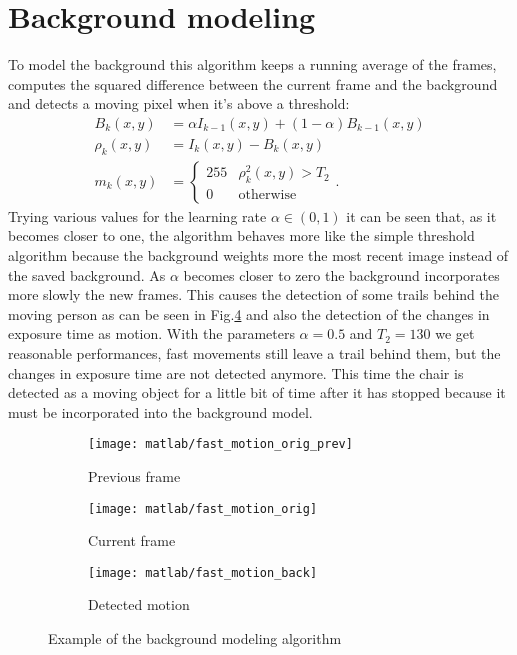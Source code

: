 \documentclass[a4paper,oneside]{article}
\begin{document}
\section*{Background modeling}
To model the background this algorithm keeps a running average of the
frames, computes the squared difference between the current frame and
the background and detects a moving pixel when it's above a threshold:
\begin{align}
  B_k(x,y) &= \alpha I_{k-1}(x,y) + (1-\alpha)B_{k-1}(x,y) \\
  \rho_k(x,y) &= I_k(x,y) - B_k(x,y) \\
  m_k(x,y) &= \begin{cases}
    255  & \rho_k^2(x,y) > T_2 \\
    0  & \text{otherwise}
    \end{cases} .
\end{align}
Trying various values for the learning rate $\alpha \in (0,1)$ it can
be seen that, as it becomes closer to one, the algorithm behaves more
like the simple threshold algorithm because the background weights
more the most recent image instead of the saved background. As
$\alpha$ becomes closer to zero the background incorporates more
slowly the new frames. This causes the detection of some trails behind
the moving person as can be seen in Fig.\ref{fig:back} and also the
detection of the changes in exposure time as motion. With the
parameters $\alpha = 0.5$ and $T_2 = 130$ we get reasonable
performances, fast movements still leave a trail behind them, but the
changes in exposure time are not detected anymore. This time the chair
is detected as a moving object for a little bit of time after it has
stopped because it must be incorporated into the background model.
\begin{figure}[htbp]
  \centering
  \begin{subfigure}{0.3\textwidth}
    \centering
    \texttt{[image: matlab/fast\_motion\_orig\_prev]}
    \caption{Previous frame}
    \label{fig:back_orig_prev}
  \end{subfigure}%
  \begin{subfigure}{0.3\textwidth}
    \centering
    \texttt{[image: matlab/fast\_motion\_orig]}
    \caption{Current frame}
    \label{fig:back_orig}
  \end{subfigure}%
  \begin{subfigure}{0.3\textwidth}
    \centering
    \texttt{[image: matlab/fast\_motion\_back]}
    \caption{Detected motion}
    \label{fig:back}
  \end{subfigure}%
  \caption{Example of the background modeling algorithm}
\end{figure}
\end{document}
